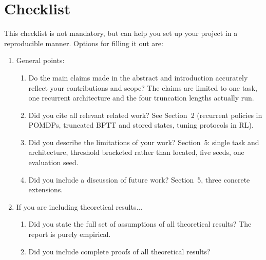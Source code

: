 \documentclass{article}
\begin{document}
\newpage
\section*{Checklist}
This checklist is not mandatory, but can help you set up your project in a reproducible manner.
Options for filling it out are:
\answerYes{}
\answerNo{}
\answerNA{}
\begin{enumerate}

\item General points:
\begin{enumerate}
  \item Do the main claims made in the abstract and introduction accurately reflect your contributions and scope?
    \answerYes{} The claims are limited to one task, one recurrent architecture and the four truncation lengths actually run.
  \item Did you cite all relevant related work?
    \answerYes{} See Section~2 (recurrent policies in POMDPs, truncated BPTT and stored states, tuning protocols in RL).
  \item Did you describe the limitations of your work?
    \answerYes{} Section~5: single task and architecture, threshold bracketed rather than located, five seeds, one evaluation seed.
  \item Did you include a discussion of future work?
    \answerYes{} Section~5, three concrete extensions.
\end{enumerate}

\item If you are including theoretical results...
\begin{enumerate}
  \item Did you state the full set of assumptions of all theoretical results?
    \answerNA{} The report is purely empirical.
	\item Did you include complete proofs of all theoretical results?
    \answerNA{}
\end{enumerate}


\end{enumerate}
\end{document}
